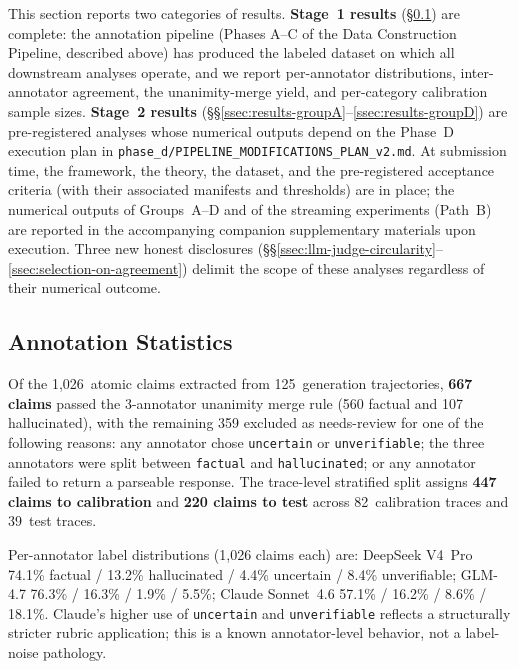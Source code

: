 \documentclass[runningheads]{llncs}
\begin{document}
This section reports two categories of results. \textbf{Stage~1 results}
(\S\ref{ssec:annotation-stats}) are complete: the annotation pipeline
(Phases A--C of the Data Construction Pipeline,
described above) has produced the labeled dataset on which all downstream
analyses operate, and we report per-annotator distributions,
inter-annotator agreement, the unanimity-merge yield, and per-category
calibration sample sizes.
\textbf{Stage~2 results} (\S\S\ref{ssec:results-groupA}--\ref{ssec:results-groupD})
are pre-registered analyses whose numerical outputs depend on the Phase~D
execution plan in \texttt{phase\_d/PIPELINE\_MODIFICATIONS\_PLAN\_v2.md}.
At submission time, the framework, the theory, the dataset, and the
pre-registered acceptance criteria (with their associated manifests and
thresholds) are in place; the numerical outputs of Groups~A--D and of the
streaming experiments (Path~B) are reported in the accompanying companion
supplementary materials upon execution. Three new honest disclosures
(\S\S\ref{ssec:llm-judge-circularity}--\ref{ssec:selection-on-agreement})
delimit the scope of these analyses regardless of their numerical outcome.

\subsection{Annotation Statistics}
\label{ssec:annotation-stats}

Of the 1{,}026~atomic claims extracted from 125~generation trajectories,
\textbf{667 claims} passed the 3-annotator unanimity merge rule (560 factual
and 107 hallucinated), with the remaining 359 excluded as needs-review for
one of the following reasons: any annotator chose \texttt{uncertain} or
\texttt{unverifiable}; the three annotators were split between
\texttt{factual} and \texttt{hallucinated}; or any annotator failed to
return a parseable response. The trace-level stratified split assigns
\textbf{447 claims to calibration} and \textbf{220 claims to test} across
82~calibration traces and 39~test traces.

Per-annotator label distributions (1{,}026 claims each) are: DeepSeek
V4~Pro 74.1\% factual / 13.2\% hallucinated / 4.4\% uncertain /
8.4\% unverifiable; GLM-4.7 76.3\% / 16.3\% / 1.9\% / 5.5\%; Claude
Sonnet~4.6 57.1\% / 16.2\% / 8.6\% / 18.1\%. Claude's higher use of
\texttt{uncertain} and \texttt{unverifiable} reflects a structurally
stricter rubric application; this is a known annotator-level behavior, not
a label-noise pathology.
\end{document}

